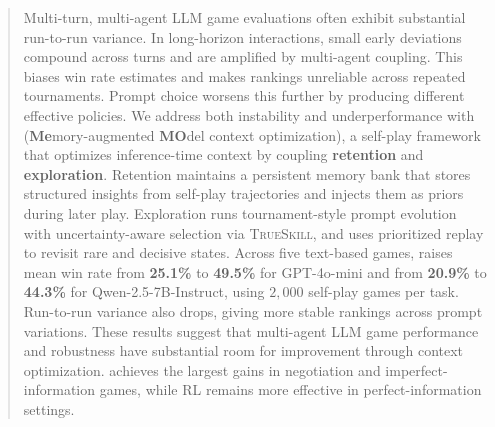 \begin{abstract}
Multi-turn, multi-agent LLM game evaluations often exhibit substantial run-to-run variance. In long-horizon interactions, small early deviations compound across turns and are amplified by multi-agent coupling. This biases win rate estimates and makes rankings unreliable across repeated tournaments. Prompt choice worsens this further by producing different effective policies. We address both instability and underperformance with \textbf{\NAME{}} (\textbf{Me}mory-augmented \textbf{MO}del context optimization), a self-play framework that optimizes inference-time context by coupling \textbf{retention} and \textbf{exploration}. Retention maintains a persistent memory bank that stores structured insights from self-play trajectories and injects them as priors during later play. Exploration runs tournament-style prompt evolution with uncertainty-aware selection via \textsc{TrueSkill}, and uses prioritized replay to revisit rare and decisive states. Across five text-based games, \NAME{} raises mean win rate from \textbf{25.1\%} to \textbf{49.5\%} for GPT-4o-mini and from \textbf{20.9\%} to \textbf{44.3\%} for Qwen-2.5-7B-Instruct, using $2,000$ self-play games per task. Run-to-run variance also drops, giving more stable rankings across prompt variations. These results suggest that multi-agent LLM game performance and robustness have substantial room for improvement through context optimization. \NAME{} achieves the largest gains in negotiation and imperfect-information games, while RL remains more effective in perfect-information settings.
\end{abstract}


